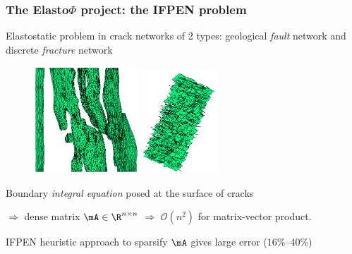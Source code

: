 

\begin{frame}

\maketitle


\end{frame}


\begin{frame}
\frametitle{The Elasto$\Phi$ project: the IFPEN problem} 

Elastostatic problem in \alert{crack networks} of 2 types:  geological \emph{fault} network and discrete \emph{fracture} network 

\vspace{-5pt}

\begin{figure}
\centering
\includegraphics[width=0.35\textwidth]{../images/visu_maillage5364FracsTriangles.png} \quad
\includegraphics[width=0.25\textwidth]{../images/visu_maillage1994Fracs.png}
\end{figure}

Boundary \emph{integral equation} posed at the surface of cracks

$\Rightarrow$ \alert{dense matrix} $\mA\in \R^{n\times n}$
$\Rightarrow$ $\mathcal{O}(n^{2})$ for matrix-vector product.

\medskip
IFPEN heuristic approach to sparsify $\mA$ gives large error ($16$\%--$40$\%)

\end{frame}

